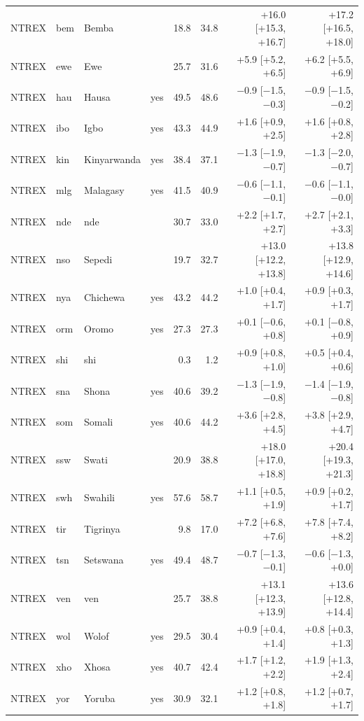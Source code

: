 {\begin{longtable}{@{}lllcrrrr@{}}
NTREX & bem & Bemba &  & 18.8 & 34.8 & +16.0 [+15.3, +16.7] & +17.2 [+16.5, +18.0] \\
NTREX & ewe & Ewe &  & 25.7 & 31.6 & +5.9 [+5.2, +6.5] & +6.2 [+5.5, +6.9] \\
NTREX & hau & Hausa & yes & 49.5 & 48.6 & $-$0.9 [$-$1.5, $-$0.3] & $-$0.9 [$-$1.5, $-$0.2] \\
NTREX & ibo & Igbo & yes & 43.3 & 44.9 & +1.6 [+0.9, +2.5] & +1.6 [+0.8, +2.8] \\
NTREX & kin & Kinyarwanda & yes & 38.4 & 37.1 & $-$1.3 [$-$1.9, $-$0.7] & $-$1.3 [$-$2.0, $-$0.7] \\
NTREX & mlg & Malagasy & yes & 41.5 & 40.9 & $-$0.6 [$-$1.1, $-$0.1] & $-$0.6 [$-$1.1, $-$0.0] \\
NTREX & nde & nde &  & 30.7 & 33.0 & +2.2 [+1.7, +2.7] & +2.7 [+2.1, +3.3] \\
NTREX & nso & Sepedi &  & 19.7 & 32.7 & +13.0 [+12.2, +13.8] & +13.8 [+12.9, +14.6] \\
NTREX & nya & Chichewa & yes & 43.2 & 44.2 & +1.0 [+0.4, +1.7] & +0.9 [+0.3, +1.7] \\
NTREX & orm & Oromo & yes & 27.3 & 27.3 & +0.1 [$-$0.6, +0.8] & +0.1 [$-$0.8, +0.9] \\
NTREX & shi & shi &  & 0.3 & 1.2 & +0.9 [+0.8, +1.0] & +0.5 [+0.4, +0.6] \\
NTREX & sna & Shona & yes & 40.6 & 39.2 & $-$1.3 [$-$1.9, $-$0.8] & $-$1.4 [$-$1.9, $-$0.8] \\
NTREX & som & Somali & yes & 40.6 & 44.2 & +3.6 [+2.8, +4.5] & +3.8 [+2.9, +4.7] \\
NTREX & ssw & Swati &  & 20.9 & 38.8 & +18.0 [+17.0, +18.8] & +20.4 [+19.3, +21.3] \\
NTREX & swh & Swahili & yes & 57.6 & 58.7 & +1.1 [+0.5, +1.9] & +0.9 [+0.2, +1.7] \\
NTREX & tir & Tigrinya &  & 9.8 & 17.0 & +7.2 [+6.8, +7.6] & +7.8 [+7.4, +8.2] \\
NTREX & tsn & Setswana & yes & 49.4 & 48.7 & $-$0.7 [$-$1.3, $-$0.1] & $-$0.6 [$-$1.3, +0.0] \\
NTREX & ven & ven &  & 25.7 & 38.8 & +13.1 [+12.3, +13.9] & +13.6 [+12.8, +14.4] \\
NTREX & wol & Wolof & yes & 29.5 & 30.4 & +0.9 [+0.4, +1.4] & +0.8 [+0.3, +1.3] \\
NTREX & xho & Xhosa & yes & 40.7 & 42.4 & +1.7 [+1.2, +2.2] & +1.9 [+1.3, +2.4] \\
NTREX & yor & Yoruba & yes & 30.9 & 32.1 & +1.2 [+0.8, +1.8] & +1.2 [+0.7, +1.7] \\

\end{longtable}}

